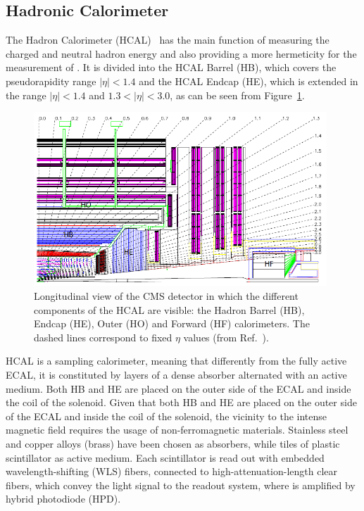 \subsection{Hadronic Calorimeter}
\label{subsec:hcalo}

The Hadron Calorimeter (HCAL)~\cite{hcalTDR} has the main function of measuring the charged and neutral 
hadron energy and also providing a more hermeticity for the measurement of \met.
It is divided into the HCAL Barrel (HB), which covers the pseudorapidity range $|\eta|<1.4$ and the
HCAL Endcap (HE), which is extended in the range $|\eta|<1.4$ and $1.3<|\eta|<3.0$,
as can be seen from Figure~\ref{fig:hcalLayout}.

\begin{figure}[hbt]
  \begin{center}
    \includegraphics[width=0.98\textwidth]{figDetector/HCALlayout.png}
    \caption{Longitudinal view of the CMS detector in which the different components of the HCAL are visible:
             the Hadron Barrel (HB), Endcap (HE), Outer (HO) and Forward (HF) calorimeters. 
             The dashed lines correspond to fixed $\eta$ values (from Ref.~\cite{Chatrchyan:2008aa}).} 
    \label{fig:hcalLayout}
  \end{center}
\end{figure}

HCAL is a sampling calorimeter, meaning that differently from the fully active ECAL,
it is constituted by layers of a dense absorber alternated with an active medium.
Both HB and HE are placed on the outer side of the ECAL and inside the coil of the solenoid. 
Given that both HB and HE are placed on the outer side of the ECAL and inside the coil of the solenoid,
the vicinity to the intense magnetic field requires the usage of non-ferromagnetic materials.
Stainless steel and copper alloys (brass) have been chosen as absorbers, while tiles 
of plastic scintillator as active medium. Each scintillator is read out with embedded wavelength-shifting (WLS) fibers, connected to 
high-attenuation-length clear fibers, which convey the light signal to the readout system,
where is amplified by hybrid photodiode (HPD).

